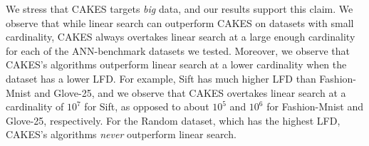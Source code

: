 We stress that CAKES targets \emph{big} data, and our results support this claim.
We observe that while linear search can outperform CAKES on datasets with small cardinality, CAKES always overtakes linear search at a large enough cardinality for each of the ANN-benchmark datasets we tested.
Moreover, we observe that CAKES's algorithms outperform linear search at a lower cardinality when the dataset has a lower LFD.
For example, Sift has much higher LFD than Fashion-Mnist and Glove-25, and we observe that CAKES overtakes linear search at a cardinality of $10^{7}$  for Sift, as opposed to about $10^{5}$ and $10^{6}$ for Fashion-Mnist and Glove-25, respectively.
For the Random dataset, which has the highest LFD, CAKES's algorithms \emph{never} outperform linear search.



